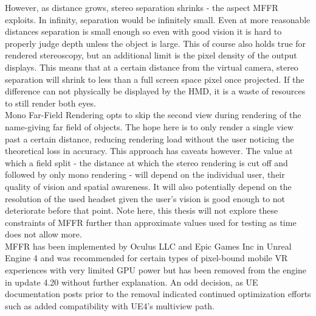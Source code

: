 However, as distance grows, stereo separation shrinks - the aspect \gls{MFFR} exploits. In infinity, separation would be infinitely small. Even at more reasonable distances separation is small enough so even with good vision it is hard to properly judge depth unless the object is large. This of course also holds true for rendered stereoscopy, but an additional limit is the pixel density of the output displays. This means that at a certain distance from the virtual camera, stereo separation will shrink to less than a full screen space pixel once projected. If the difference can not physically be displayed by the \gls{HMD}, it is a waste of resources to still render both eyes. \\
Mono Far-Field Rendering opts to skip the second view during rendering of the name-giving far field of objects. The hope here is to only render a single view past a certain distance, reducing rendering load without the user noticing the theoretical loss in accuracy. 
This approach has caveats however. The value at which a field split - the distance at which the stereo rendering is cut off and followed by only mono rendering - will depend on the individual user, their quality of vision and spatial awareness. It will also potentially depend on the resolution of the used headset given the user's vision is good enough to not deteriorate before that point. Note here, this thesis will not explore these constraints of \gls{MFFR} further than approximate values used for testing as time does not allow more. \\
\gls{MFFR} has been implemented by Oculus LLC and Epic Games Inc in Unreal Engine 4 and was recommended for certain types of pixel-bound mobile \gls{VR} experiences with very limited GPU power but  has been removed from the engine in update 4.20 without further explanation. An odd decision, as UE documentation posts prior to the removal indicated continued optimization efforts such as added compatibility with UE4's multiview path\cite{EpicGamesInc..2016}. 

